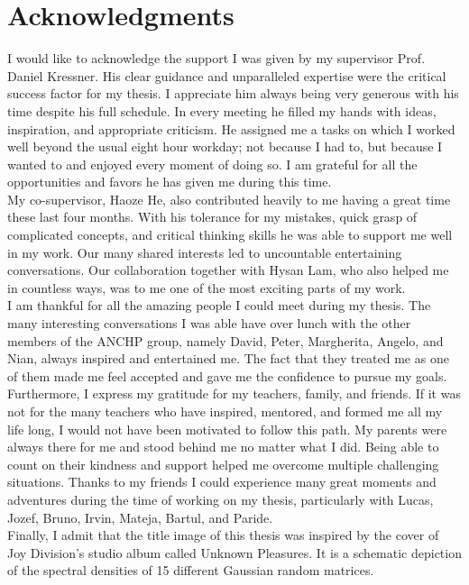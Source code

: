 \chapter*{Acknowledgments}
\label{chp:0-acknowledgments}

I would like to acknowledge the support I was given by my supervisor
Prof. Daniel Kressner. His clear guidance and unparalleled expertise were the
critical success factor for my thesis. I appreciate him always being very generous
with his time despite his full schedule. In every meeting he filled my hands with
ideas, inspiration, and appropriate criticism. He assigned me a tasks on which
I worked well beyond the usual eight hour workday; not because I had to, but because
I wanted to and enjoyed every moment of doing so. I am grateful for all the
opportunities and favors he has given me during this time.\\

My co-supervisor, Haoze He, also contributed heavily to me having a great time
these last four months. With his tolerance for my mistakes, quick grasp of
complicated concepts, and critical thinking skills he was able to support me
well in my work. Our many shared interests led to uncountable
entertaining conversations. Our collaboration together with Hysan Lam, who
also helped me in countless ways, was to me one of the most exciting parts of
my work.\\

I am thankful for all the amazing people I could meet during my thesis.
The many interesting conversations I was able have over lunch with
the other members of the ANCHP group, namely David, Peter,
Margherita, Angelo, and Nian, always inspired and entertained me.
The fact that they treated me as one of them made me feel accepted and gave 
me the confidence to pursue my goals.\\

Furthermore, I express my gratitude for my teachers, family, and friends.
If it was not for the many teachers who have inspired, mentored, and formed me
all my life long, I would not have been motivated to follow this path.
My parents were always there for me and stood behind me no matter what I did.
Being able to count on their kindness and support helped me overcome multiple
challenging situations. Thanks to my friends I could experience many great moments and adventures
during the time of working on my thesis, particularly with Lucas, Jozef, Bruno,
Irvin, Mateja, Bartul, and Paride.\\ 

Finally, I admit that the title image of this thesis was inspired
by the cover of Joy Division's studio album called Unknown Pleasures.
It is a schematic depiction of the spectral densities of 15 different Gaussian random matrices.

